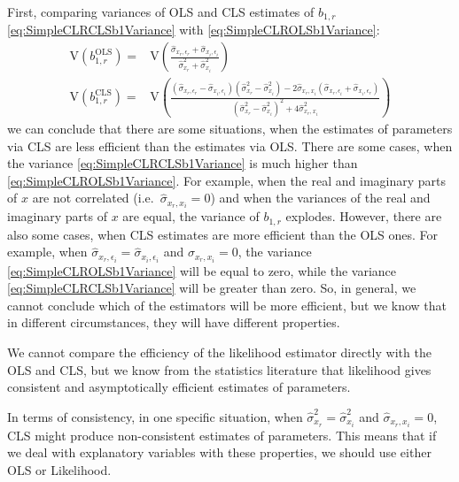 \documentclass[
]{book}
\begin{document}
First, comparing variances of OLS and CLS estimates of \(b_{1,r}\) \eqref{eq:SimpleCLRCLSb1Variance} with \eqref{eq:SimpleCLROLSb1Variance}:
\begin{equation*}
    \begin{aligned}
        \mathrm{V}(b_{1,r}^{\mathrm{OLS}}) = & \mathrm{V}\left(\frac{\hat{\sigma}_{x_r, \epsilon_r} + \hat{\sigma}_{x_i, \epsilon_i}}{\hat{\sigma}_{x_r}^2 + \hat{\sigma}_{x_i}^2}\right) \\
        \mathrm{V}(b_{1,r}^{\mathrm{CLS}}) = & \mathrm{V}\left(\frac{\left(\hat{\sigma}_{x_r, \epsilon_r} - \hat{\sigma}_{x_i, \epsilon_i}\right) \left(\hat{\sigma}_{x_r}^2 - \hat{\sigma}_{x_i}^2 \right) - 2 \hat{\sigma}_{x_r, x_i} \left(\hat{\sigma}_{x_r, \epsilon_i} + \hat{\sigma}_{x_i, \epsilon_r}\right)}{\left(\hat{\sigma}_{x_r}^2 - \hat{\sigma}_{x_i}^2\right)^2 + 4 \hat{\sigma}_{x_r, x_i}^2}\right)
    \end{aligned}
\end{equation*}
we can conclude that there are some situations, when the estimates of parameters via CLS are less efficient than the estimates via OLS. There are some cases, when the variance \eqref{eq:SimpleCLRCLSb1Variance} is much higher than \eqref{eq:SimpleCLROLSb1Variance}. For example, when the real and imaginary parts of \(x\) are not correlated (i.e.~\(\hat{\sigma}_{x_r, x_i}=0\)) and when the variances of the real and imaginary parts of \(x\) are equal, the variance of \(b_{1,r}\) explodes. However, there are also some cases, when CLS estimates are more efficient than the OLS ones. For example, when \(\hat{\sigma}_{x_r, \epsilon_i}=\hat{\sigma}_{x_i, \epsilon_i}\) and \(\hat{\sigma}_{x_r, x_i}=0\), the variance \eqref{eq:SimpleCLROLSb1Variance} will be equal to zero, while the variance \eqref{eq:SimpleCLRCLSb1Variance} will be greater than zero. So, in general, we cannot conclude which of the estimators will be more efficient, but we know that in different circumstances, they will have different properties.

We cannot compare the efficiency of the likelihood estimator directly with the OLS and CLS, but we know from the statistics literature \citep{referenceLikelihoodPaper} that likelihood gives consistent and asymptotically efficient estimates of parameters.

In terms of consistency, in one specific situation, when \(\hat{\sigma}_{x_r}^2 = \hat{\sigma}_{x_i}^2\) and \(\hat{\sigma}_{x_r, x_i}=0\), CLS might produce non-consistent estimates of parameters. This means that if we deal with explanatory variables with these properties, we should use either OLS or Likelihood.
\end{document}
